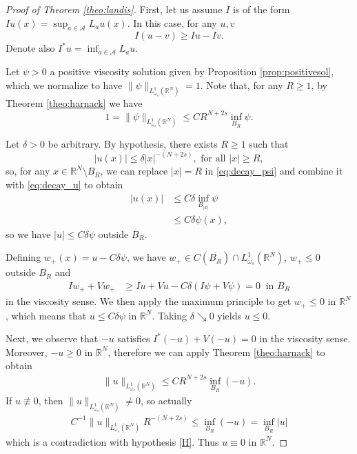 \documentclass[a4paper,11pt]{article}
\newcommand{\R}{\mathbb{R}}
\newcommand{\A}{\mathcal{A}}
\newcommand{\Lomega}{L_{\omega_s}^1(\R^N)}
\begin{document}
\begin{proof}[Proof of Theorem \ref{theo:landis}]
First, let us assume $I$ is of the form $Iu(x) = \sup_{a\in \A} L_au(x)$. In this case, for any $u,v$
\[I(u-v) \geq Iu-Iv.\]
Denote also $I^*u = \inf_{a\in \A} L_a u$.

Let $\psi>0$ a positive viscosity solution given by Proposition \ref{prop:positivesol}, which we normalize to have $\|\psi\|_{\Lomega} = 1$. Note that, for any $R\geq 1$, by Theorem \ref{theo:harnack} we have
\begin{equation} 
\label{eq:decay_psi}
1 = \|\psi\|_{\Lomega} \leq C R^{N+2s}\inf_{B_R}\psi .
\end{equation}

Let $\delta >0 $ be arbitrary. By hypothesis, there exists $R\geq 1$ such that
\begin{equation}
\label{eq:decay_u}
|u(x)|\leq \delta |x|^{-(N+2s)},\textrm{ for all } |x|\geq R,
\end{equation}
so, for any $x\in \R^N \setminus B_R$, we can replace $|x| = R$ in \eqref{eq:decay_psi} and combine it with \eqref{eq:decay_u} to obtain
\begin{align*}
|u(x)|&\leq C\delta \inf_{B_{|x|}} \psi \\
&\leq C\delta \psi(x),
\end{align*} 
so we have $|u|\leq C\delta\psi$ outside $B_R$.

Defining $w_+(x) = u - C\delta \psi$, we have $w_+ \in C(\overline{B_R})\cap \Lomega$, $w_+ \leq 0$ outside $B_R$ and
\begin{align*}
Iw_+ + Vw_+ &\geq Iu + Vu -C\delta (I\psi  + V\psi) = 0 ~ \text{ in }B_R
\end{align*}
in the viscosity sense. We then apply the maximum principle to get $w_+\leq 0$ in $\R^N$, which means that $ u \leq C\delta \psi$ in $\R^N$. Taking $\delta \searrow 0$ yields $u \leq 0$. 

Next, we observe that $-u$ satisfies $I^*(-u) +V(-u) = 0$ in the viscosity sense. Moreover, $-u \geq 0$ in $\R^N$, therefore we can apply Theorem \ref{theo:harnack} to obtain
\begin{align*}
\|u\|_{\Lomega} \leq CR^{N+2s} \inf_{B_R} (-u) .
\end{align*}
If $u\not \equiv 0$, then $\|u\|_{\Lomega} \neq 0$, so actually 
\begin{align*}
 C^{-1}\|u\|_{\Lomega}R^{-(N+2s)} \leq \inf_{B_R}(-u) = \inf_{B_R} |u|
\end{align*}
which is a contradiction with hypothesis \eqref{H}. Thus $u\equiv 0$  in $\R^N$. 


\end{proof}
\end{document}

